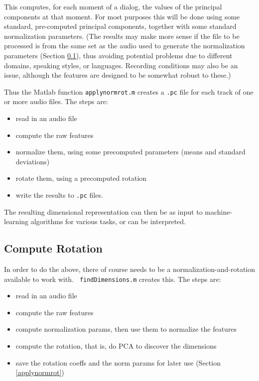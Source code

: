 \documentclass[11pt]{article}
\begin{document}
This computes, for each moment of a dialog, the values of the
principal components at that moment.  For most purposes this will be
done using some standard, pre-computed principal components, together
with some standard normalization parameters.  (The results may make
more sense if the file to be processed is from the same set as the
audio used to generate the normalization parameters (Section
\ref{computerotation}), thus avoiding potential problems due to
different domains, speaking styles, or languages.  Recording
conditions may also be an issue, although the features are designed to
be somewhat robust to these.)

Thus the Matlab function {\tt applynormrot.m} creates a {\tt .pc} file
for each track of one or more audio files.  The steps are:
\begin{itemize}   \setlength{\itemsep}{0pt}\setlength{\parskip}{0pt}
\item read in an audio file 
\item compute the raw  features
\item normalize them, using some precomputed parameters (means and
  standard deviations)
\item  rotate them, using a precomputed rotation
\item  write the results to {\tt .pc} files.
\end{itemize}

The resulting dimensional representation can then be as input to
machine-learning algorithms for various tasks, or can be interpreted.


\subsection{Compute Rotation} \label{computerotation}

In order to do the above, there of course needs to be a
normalization-and-rotation available to work with.  {\tt
  findDimensions.m} creates this.  The steps are:
\begin{itemize}   \setlength{\itemsep}{0pt}\setlength{\parskip}{0pt}
\item read in an audio file 
\item compute the raw  features
\item compute normalization params, then use them to normalize the features
\item compute the rotation, that is, do PCA to discover the dimensions
\item save the rotation coeffs and the norm params for later use (Section \ref{applynormrot})
\end{itemize}
\end{document}
